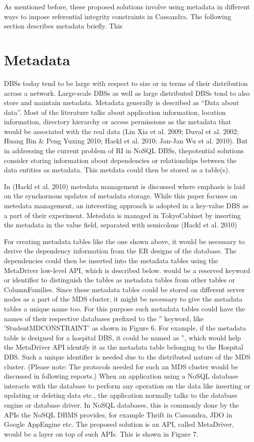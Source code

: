 % 


As mentioned before, these proposed solutions involve using metadata in
different ways to impose referential integrity constraints in Cassandra. The
following section describes metadata briefly. This 


\section{Metadata}\label{s:metadata}
DBSs today tend to be large with respect to size or in terms of their
distribution across a network. Large-scale DBSs as well as large distributed
DBSs tend to also store and maintain metadata. Metadata generally is described
as ``Data about data''. Most of the literature talks about application
information, location information, directory hierarchy or access permissions as
the metadata that would be associated with the real data (Lin Xia et al. 2009;
Duval et al. 2002; Huang Bin \& Peng Yuxing 2010; Hackl et al. 2010; Jan-Jan Wu
et al. 2010). But in addressing the current problem of RI in NoSQL DBSs,
thepotential solutions consider storing information about dependencies or
relationships between the data entities as metadata. This metdata could then be
stored as a table(s).

In (Hackl et al. 2010) metedata management is discussed where emphasis is laid
on the synchornous updates of metadata storage. While this paper focuses on
metedata management, an interesting approach is adopted in a key-value DBS as a
part of their experiment. Metedata is managed in TokyoCabinet by inserting the
metadata in the value field, separated with semicolons (Hackl et al. 2010)

For creating metadata tables like the one shown above, it would be necessary to
derive the dependency information from the ER designs of the database. The
dependencies could then be inserted into the metadata tables using the
MetaDriver low-level API, which is described below.
 would be a reserved keyword or identifier to distinguish the
tables as metadata tables from other tables or ColumnFamilies. Since these
metadata tables could be stored on different server nodes as a part of the MDS
cluster, it might be necessary to give the metadata tables a unique name too.
For this purpose such metadata tables could have the names of their respective
databases prefixed to the '' keyword, like 'StudentMDCONSTRAINT'
as shown in Figure 6. For example, if the metadata table is designed for a
hospital DBS, it could be named as '', which would help
the MetaDriver API identify it as the metadata table belonging to the Hospital
DBS. Such a unique identifier is needed due to the distributed nature of the MDS
cluster. (Please note: The protocols needed for such an MDS cluster would be
discussed in following reports.) When an application using a NoSQL database
interacts with the database to perform any operation on the data like inserting
or updating or deleting data etc., the application normally talks to the
database engine or database driver. In NoSQL databases, this is commonly done by
the APIs the NoSQL DBMS provides, for example Thrift in Cassandra, JDO in Google
AppEngine etc. The proposed solution is an API, called MetaDriver, would be a
layer on top of such APIs. This is shown in Figure 7.

